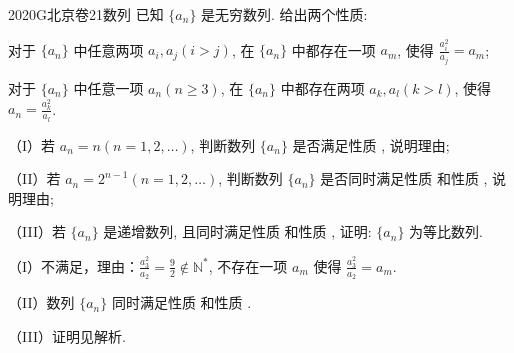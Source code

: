 
\begin{problem}{2020}{G}{北京卷}{21}{数列}
已知 $\{a_n\}$ 是无穷数列. 给出两个性质:

 对于 $\{a_n\}$ 中任意两项 $a_i, a_j (i > j)$, 在 $\{a_n\}$ 中都存在一项 $a_m$, 使得 $\displaystyle \frac{a_i^2}{a_j} = a_m$;

 对于 $\{a_n\}$ 中任意一项 $a_n (n \geqslant 3)$, 在 $\{a_n\}$ 中都存在两项 $a_k, a_l (k > l)$, 使得 $\displaystyle a_n = \frac{a_k^2}{a_l}$.

（I）若 $a_n = n (n = 1, 2, \dots)$, 判断数列 $\{a_n\}$ 是否满足性质 , 说明理由;

（II）若 $a_n = 2^{n-1} (n = 1, 2, \dots)$, 判断数列 $\{a_n\}$ 是否同时满足性质  和性质 , 说明理由;

（III）若 $\{a_n\}$ 是递增数列, 且同时满足性质  和性质 , 证明: $\{a_n\}$ 为等比数列.
\end{problem}

\begin{answer}
（I）不满足，理由：$\displaystyle \frac{a_3^2}{a_2} = \frac{9}{2} \notin \mathbb{N}^*$, 不存在一项 $a_m$ 使得 $\displaystyle \frac{a_3^2}{a_2} = a_m$.

（II）数列 $\{a_n\}$ 同时满足性质  和性质 .

（III）证明见解析.
\end{answer}

